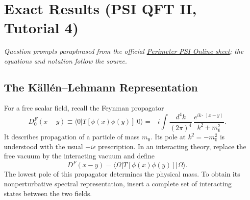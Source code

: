 \section{Exact Results (PSI QFT II, Tutorial 4)}

\noindent\textit{Question prompts paraphrased from the official
\href{https://psi-online.perimeterinstitute.ca/courses/take/quantum-field-theory-ii-student/pdfs/20776379-module-4-tutorial-1}{Perimeter PSI Online sheet};
the equations and notation follow the source.}

\subsection{The K\"all\'en--Lehmann Representation}

For a free scalar field, recall the Feynman propagator
\begin{equation}
    D_0^F(x-y)
    \equiv \langle 0|T[\phi(x)\phi(y)]|0\rangle
    =-i\int\frac{d^4k}{(2\pi)^4}\,
    \frac{e^{ik\cdot(x-y)}}{k^2+m_0^2}.
\end{equation}
It describes propagation of a particle of mass $m_0$. Its pole at
$k^2=-m_0^2$ is understood with the usual $-i\epsilon$ prescription. In an
interacting theory, replace the free vacuum by the interacting vacuum and define
\begin{equation}
    D^F(x-y)=\langle\Omega|T[\phi(x)\phi(y)]|\Omega\rangle.
\end{equation}
The lowest pole of this propagator determines the physical mass. To obtain its
nonperturbative spectral representation, insert a complete set of interacting
states between the two fields.

